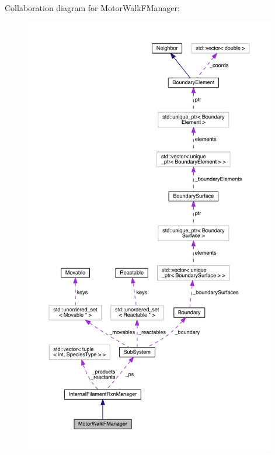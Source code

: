 Collaboration diagram for Motor\+Walk\+F\+Manager\+:
\nopagebreak
\begin{figure}[H]
\begin{center}
\leavevmode
\includegraphics[height=550pt]{classMotorWalkFManager__coll__graph}
\end{center}
\end{figure}
